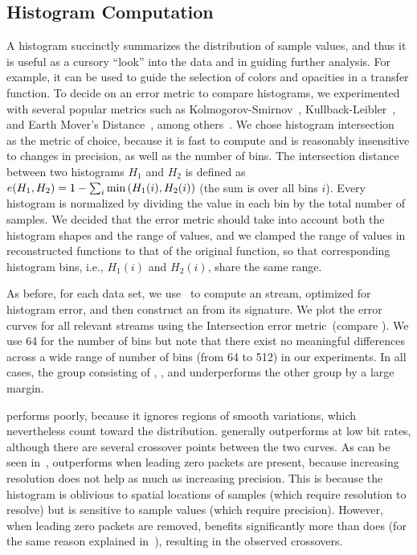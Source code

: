 \subsection{Histogram Computation}\label{sec:histogram}

A histogram succinctly summarizes the distribution of sample values, and thus it is useful as a
cursory ``look'' into the data and in guiding further analysis. For example, it can be used to guide
the selection of colors and opacities in a transfer function. To decide on an error metric to
compare histograms, we experimented with several popular metrics such as
Kolmogorov-Smirnov~\cite{smirnov1948}, Kullback-Leibler~\cite{kullback1951}, and Earth Mover's
Distance~\cite{emd1998}, among others~\cite{Hellinger1909,Bhattacharyya1943}. We chose histogram
intersection~\cite{histogram_intersection1991} as the metric of choice, because it is fast to
compute and is reasonably insensitive to changes in precision, as well as the number of bins. The
intersection distance between two histograms $H_1$ and $H_2$ is defined as
$e(H_1,H_2)=1-\sum_{i}{\min{(H_1(i),H_2(i))}}$ (the sum is over all bins $i$). Every histogram is
normalized by dividing the value in each bin by the total number of samples. We decided that the
error metric should take into account both the histogram shapes and the range of values, and we
clamped the range of values in reconstructed functions to that of the original function, so that
corresponding histogram bins, i.e., $H_1(i)$ and $H_2(i)$, share the same range.

As before, for each data set, we use~ to compute an \shop stream, optimized for
histogram error, and then construct an \shsg from its signature. We plot the error curves for all
relevant streams using the Intersection error metric~(compare
). We use 64 for the number of bins but note that there exist
no meaningful differences across a wide range of number of bins (from 64 to 512) in our experiments.
In all cases, the group consisting of \sbit, \slvl, and \smag underperforms the other group by a
large margin.

\smag performs poorly, because it ignores regions of smooth variations, which nevertheless count
toward the distribution. \slvl generally outperforms \sbit at low bit rates, although there are
several crossover points between the two curves. As can be seen in~,
\slvl outperforms \sbit when leading zero packets are present, because increasing resolution does
not help as much as increasing precision. This is because the histogram is oblivious to spatial
locations of samples (which require resolution to resolve) but is sensitive to sample values (which
require precision). However, when leading zero packets are removed, \sbit benefits significantly
more than \slvl does (for the same reason explained in~), resulting in the
observed crossovers.

